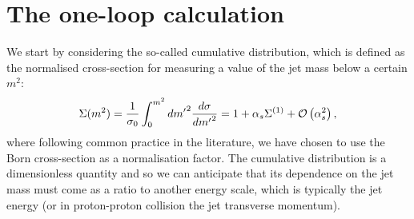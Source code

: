 \section{The one-loop calculation}
We start by considering the so-called cumulative distribution, which is defined as the normalised cross-section for measuring a value of the jet mass below a certain $m^2$:
\begin{equation}\label{eq:cumu-def}
\Sigma(m^2)= \frac{1}{\sigma_0}\int_0^{m^2} d {m'}^2 \frac{d \sigma}{d {m'}^2}=1+\alpha_s \Sigma^{(1)}+\mathcal{O} \left( \alpha_s^2\right),
\end{equation}
where following common practice in the literature, we have chosen to use the Born cross-section as a normalisation factor. The cumulative distribution is a dimensionless quantity and so we can anticipate that its dependence on the jet mass must come as a ratio to another energy scale, which is typically the jet energy (or in proton-proton collision the jet transverse momentum).

